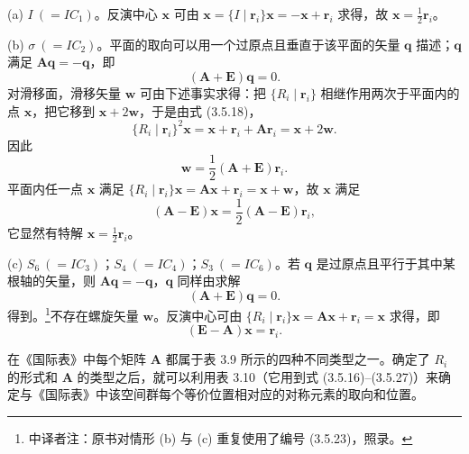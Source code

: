 \noindent(a) $I\ ( = IC_{1})$。反演中心 $\mathbf{x}$ 可由 $\mathbf{x} = \{I \mid \mathbf{r}_{i}\}\mathbf{x} = -\mathbf{x} + \mathbf{r}_{i}$ 求得，故 $\mathbf{x} = \frac{1}{2}\mathbf{r}_{i}$。

\noindent(b) $\sigma\ ( = IC_{2})$。平面的取向可以用一个过原点且垂直于该平面的矢量 $\mathbf{q}$ 描述；$\mathbf{q}$ 满足 $\mathbf{A}\mathbf{q} = -\mathbf{q}$，即
\begin{equation*}
(\mathbf{A} + \mathbf{E})\mathbf{q} = 0.
\tag{3.5.23}
\end{equation*}
对滑移面，滑移矢量 $\mathbf{w}$ 可由下述事实求得：把 $\{R_{i} \mid \mathbf{r}_{i}\}$ 相继作用两次于平面内的点 $\mathbf{x}$，把它移到 $\mathbf{x} + 2\mathbf{w}$，于是由式 (3.5.18)，
\begin{equation*}
\{R_{i} \mid \mathbf{r}_{i}\}^{2}\mathbf{x} = \mathbf{x} + \mathbf{r}_{i} + \mathbf{A}\mathbf{r}_{i} = \mathbf{x} + 2\mathbf{w}.
\tag{3.5.24}
\end{equation*}
因此
\begin{equation*}
\mathbf{w} = \frac{1}{2}(\mathbf{A} + \mathbf{E})\mathbf{r}_{i}.
\tag{3.5.25}
\end{equation*}
平面内任一点 $\mathbf{x}$ 满足 $\{R_{i} \mid \mathbf{r}_{i}\}\mathbf{x} = \mathbf{A}\mathbf{x} + \mathbf{r}_{i} = \mathbf{x} + \mathbf{w}$，故 $\mathbf{x}$ 满足
\begin{equation*}
(\mathbf{A} - \mathbf{E})\mathbf{x} = \frac{1}{2}(\mathbf{A} - \mathbf{E})\mathbf{r}_{i},
\tag{3.5.26}
\end{equation*}
它显然有特解 $\mathbf{x} = \frac{1}{2}\mathbf{r}_{i}$。

\noindent(c) $S_{6}\ ( = IC_{3})$；$S_{4}\ ( = IC_{4})$；$S_{3}\ ( = IC_{6})$。若 $\mathbf{q}$ 是过原点且平行于其中某根轴的矢量，则 $\mathbf{A}\mathbf{q} = -\mathbf{q}$，$\mathbf{q}$ 同样由求解
\begin{equation*}
(\mathbf{A} + \mathbf{E})\mathbf{q} = 0.
\tag{3.5.23}
\end{equation*}
得到。\footnote{中译者注：原书对情形 (b) 与 (c) 重复使用了编号 (3.5.23)，照录。}不存在螺旋矢量 $\mathbf{w}$。反演中心可由 $\{R_{i} \mid \mathbf{r}_{i}\}\mathbf{x} = \mathbf{A}\mathbf{x} + \mathbf{r}_{i} = \mathbf{x}$ 求得，即
\begin{equation*}
(\mathbf{E} - \mathbf{A})\mathbf{x} = \mathbf{r}_{i}.
\tag{3.5.27}
\end{equation*}

在《国际表》中每个矩阵 $\mathbf{A}$ 都属于表 3.9 所示的四种不同类型之一。确定了 $R_{i}$ 的形式和 $\mathbf{A}$ 的类型之后，就可以利用表 3.10（它用到式 (3.5.16)--(3.5.27)）来确定与《国际表》中该空间群每个等价位置相对应的对称元素的取向和位置。

